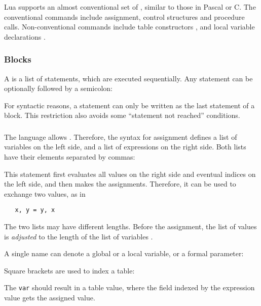 Lua supports an almost conventional set of ,
similar to those in Pascal or C.
The conventional commands include
assignment, control structures and procedure calls.
Non-conventional commands include table constructors
,
and local variable declarations .

\subsubsection{Blocks}
A  is a list of statements, which are executed sequentially.
Any statement can be optionally followed by a semicolon:
\begin{Produc}
\end{Produc}%
For syntactic reasons, a  statement can only be written
as the last statement of a block.
This restriction also avoids some ``statement not reached'' conditions.

\subsubsection{} \label{assignment}
The language allows .
Therefore, the syntax for assignment
defines a list of variables on the left side,
and a list of expressions on the right side.
Both lists have their elements separated by commas:
\begin{Produc}
\end{Produc}%
This statement first evaluates all values on the right side
and eventual indices on the left side,
and then makes the assignments.
Therefore, it can be used to exchange two values, as in
\begin{verbatim}
   x, y = y, x
\end{verbatim}
The two lists may have different lengths.
Before the assignment, the list of values is \emph{adjusted} to
the length of the list of variables .

A single name can denote a global or a local variable,
or a formal parameter:
\begin{Produc}
\end{Produc}%
Square brackets are used to index a table:
\begin{Produc}
\end{Produc}%
The \verb|var| should result in a table value,
where the field indexed by the expression value gets the assigned value.

